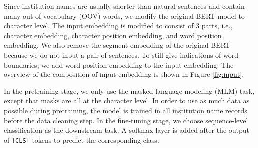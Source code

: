 \documentclass{article}
\begin{document}
Since institution names are usually shorter than natural sentences and contain many out-of-vocabulary (OOV) words, we modify the original BERT model to character level. The input embedding is modified to consist of 3 parts, i.e., character embedding, character position embedding, and word position embedding. We also remove the segment embedding of the original BERT because we do not input a pair of sentences. To still give indications of word boundaries, we add word position embedding to the input embedding. The overview of the composition of input embedding is shown in Figure \ref{fig:input}. 

In the pretraining stage, we only use the masked-language modeling (MLM) task, except that masks are all at the character level. In order to use as much data as possible during pretraining, the model is trained in all institution name records before the data cleaning step. In the fine-tuning stage, we choose sequence-level classification as the downstream task. A softmax layer is added after the output of \texttt{[CLS]} tokens to predict the corresponding class. 
\end{document}
